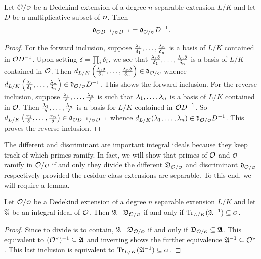     \begin{proposition}\label{prop:different_and_discriminant_respect_localization}
      Let \(\mc{O}/\smc{O}\) be a Dedekind extension of a degree \(n\) separable extension \(L/K\) and let \(D\) be a multiplicative subset of \(\smc{O}\). Then
      \[
        \mf{d}_{\mc{O}D^{-1}/\smc{O}D^{-1}} = \mf{d}_{\mc{O}/\smc{O}}D^{-1}.
      \]
    \end{proposition}
    \begin{proof}
      For the forward inclusion, suppose \(\frac{\lambda_{1}}{\delta_{1}},\ldots,\frac{\lambda_{n}}{\delta_{n}}\) is a basis of \(L/K\) contained in \(\mathcal{O}D^{-1}\). Upon setting \(\delta = \prod_{i}\delta_{i}\), we see that \(\frac{\lambda_{1}\delta}{\delta_{1}},\ldots,\frac{\lambda_{n}\delta}{\delta_{n}}\) is a basis of \(L/K\) contained in \(\mathcal{O}\). Then \(d_{L/K}\left(\frac{\l_{1}\d}{\d_{1}},\ldots,\frac{\l_{n}\d}{\d_{n}}\right) \in \mf{d}_{\mc{O}/\smc{O}}\) whence \(d_{L/K}\left(\frac{\l_{1}}{\d_{1}},\ldots,\frac{\l_{n}}{\d_{n}}\right) \in \mf{d}_{\mc{O}/\smc{O}}D^{-1}\). This shows the forward inclusion. For the reverse inclusion, suppose \(\frac{\lambda_{1}}{\delta},\ldots,\frac{\lambda_{n}}{\delta}\) is such that \(\lambda_{1},\ldots,\lambda_{n}\) is a basis of \(L/K\) contained in \(\mathcal{O}\). Then \(\frac{\lambda_{1}}{\delta},\ldots,\frac{\lambda_{n}}{\delta}\) is a basis for \(L/K\) contained in \(\mathcal{O}D^{-1}\). So \(d_{L/K}\left(\frac{\a_{1}}{\d},\ldots,\frac{\a_{n}}{\d}\right) \in \mf{d}_{\mc{O}D^{-1}/\smc{O}D^{-1}}\) whence \(d_{L/K}(\l_{1},\ldots,\l_{n}) \in \mf{d}_{\mc{O}/\smc{O}}D^{-1}\). This proves the reverse inclusion.
    \end{proof}

    The different and discriminant are important integral ideals because they keep track of which primes ramify. In fact, we will show that primes of \(\mathcal{O}\) and \(\smc{O}\) ramify in \(\mc{O}/\smc{O}\) if and only they divide the different \(\mf{D}_{\mc{O}/\smc{O}}\) and discriminant \(\mf{d}_{\mc{O}/\smc{O}}\) respectively provided the residue class extensions are separable. To this end, we will require a lemma.

    \begin{lemma}\label{lem:different_containment_lemma}
      Let \(\mc{O}/\smc{O}\) be a Dedekind extension of a degree \(n\) separable extension \(L/K\) and let \(\mathfrak{A}\) be an integral ideal of \(\mathcal{O}\). Then \(\mf{A} \mid \mf{D}_{\mc{O}/\smc{O}}\) if and only if \(\Trace_{L/K}(\mf{A}^{-1}) \subseteq \smc{O}\).
    \end{lemma}
    \begin{proof}
      Since to divide is to contain, \(\mf{A} \mid \mf{D}_{\mc{O}/\smc{O}}\) if and only if \(\mf{D}_{\mc{O}/\smc{O}} \subseteq \mf{A}\). This equivalent to \((\mathcal{O}^{\vee})^{-1} \subseteq \mathfrak{A}\) and inverting shows the further equivalence \(\mathfrak{A}^{-1} \subseteq \mathcal{O}^{\vee}\). This last inclusion is equivalent to \(\Trace_{L/K}(\mf{A}^{-1}) \subseteq \smc{O}\).
    \end{proof}

